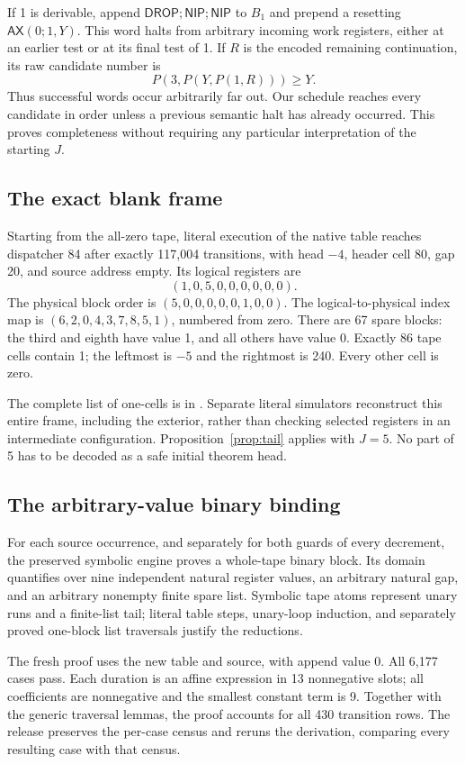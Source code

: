 \documentclass[11pt,a4paper]{article}
\theoremstyle{remark}\newtheorem{remark}[theorem]{Remark}
\newcommand{\D}{\mathsf{DROP}}
\newcommand{\N}{\mathsf{NIP}}
\newcommand{\AX}{\mathsf{AX}}
\newcommand{\file}[1]{\texttt{\path{#1}}}
\begin{document}
If 1 is derivable, append $\D;\N;\N$ to $B_1$ and prepend a resetting $\AX(0;1,Y)$. This word halts from arbitrary incoming work registers, either at an earlier test or at its final test of 1. If $R$ is the encoded remaining continuation, its raw candidate number is
\[
 P(3,P(Y,P(1,R)))\geq Y.
\]
Thus successful words occur arbitrarily far out. Our schedule reaches every candidate in order unless a previous semantic halt has already occurred. This proves completeness without requiring any particular interpretation of the starting $J$.

\subsection{The exact blank frame}

Starting from the all-zero tape, literal execution of the native table reaches dispatcher 84 after exactly 117,004 transitions, with head $-4$, header cell 80, gap 20, and source address empty. Its logical registers are
\[
 (1,0,5,0,0,0,0,0,0).
\]
The physical block order is $(5,0,0,0,0,0,1,0,0)$. The logical-to-physical index map is $(6,2,0,4,3,7,8,5,1)$, numbered from zero. There are 67 spare blocks: the third and eighth have value 1, and all others have value 0. Exactly 86 tape cells contain 1; the leftmost is $-5$ and the rightmost is 240. Every other cell is zero.

The complete list of one-cells is in \file{evidence/blank_startup.json}. Separate literal simulators reconstruct this entire frame, including the exterior, rather than checking selected registers in an intermediate configuration. Proposition~\ref{prop:tail} applies with $J=5$. No part of 5 has to be decoded as a safe initial theorem head.

\subsection{The arbitrary-value binary binding}

For each source occurrence, and separately for both guards of every decrement, the preserved symbolic engine proves a whole-tape binary block. Its domain quantifies over nine independent natural register values, an arbitrary natural gap, and an arbitrary nonempty finite spare list. Symbolic tape atoms represent unary runs and a finite-list tail; literal table steps, unary-loop induction, and separately proved one-block list traversals justify the reductions.

The fresh proof uses the new table and source, with append value 0. All 6,177 cases pass. Each duration is an affine expression in 13 nonnegative slots; all coefficients are nonnegative and the smallest constant term is 9. Together with the generic traversal lemmas, the proof accounts for all 430 transition rows. The release preserves the per-case census and reruns the derivation, comparing every resulting case with that census.
\end{document}
